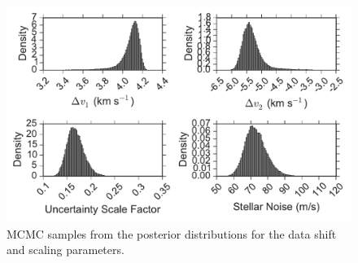 \documentclass[twocolumn]{emulateapj}
\begin{document}
\begin{figure}
  \centering
  \includegraphics[width=\columnwidth]{Distributions_2.pdf}
  \caption{MCMC samples from the posterior distributions for the data shift and scaling parameters.}
  \label{fig:datamanip_dist}
\end{figure}


\newpage

\end{document}

